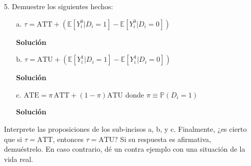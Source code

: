 \documentclass[a4paper, answers, addpoints, 11pt]{exam}
\begin{document}
\begin{itemize}
\begin{mdframed}
\begin{proof}
\begin{align*}
&=E[Y_i | D_i = 1] - E[Y_i | D_i = 0]\\&=E[Y_i^{1}  | D_i = 1] - E[Y_i^{0}  | D_i = 1] &\text{(Como $Y_i=Y_i^{0} (1-D_i)+ Y_i^{1} D_i$ )}
\\&=E[Y_i^{1}  | D_i = 1] - E[Y_i^{0}  | D_i = 1] &\text{(Como experimento es aleatorio $E[Y_i^{0} | D_i = 0]=E[Y_i^{0} | D_i = 0] $ )}\\&=\mathbb{E}[Y^{1}_{i} - Y^{0}_{i} | D_i = 1]
\end{align*}

     
\begin{align*}
E[Y_i | D_i = 1] - E[Y_i | D_i = 0] &= E[Y_i | D_i = 1] - E[Y_i | D_i = 1] \\&=\mathbb{E}[Y^{1}_{i} - Y^{0}_{i} | D_i = 1]\\&=\tau
\end{align*}
\end{proof}

        \end{mdframed}

    \item[5.] Demuestre los siguientes hechos:

    \begin{itemize}
        \item[a.] $\tau = \text{ATT}+\left( \mathbb{E}[Y^{0}_{i}|D_i=1]-\mathbb{E}[Y^{0}_{i}|D_i=0] \right)$
         \begin{mdframed}
        \textbf{Solución}\\
        \end{mdframed}

        \item[b.] $\tau= \text{ATU}+\left( \mathbb{E}[Y^{1}_{i}|D_i=1]-\mathbb{E}[Y^{1}_{i}|D_i=0] \right)$
         \begin{mdframed}
        \textbf{Solución}\\
        \end{mdframed}

        \item[c.] $\text{ATE}=\pi \,\text{ATT}+(1-\pi)\text{ATU}$ \quad donde $\pi \equiv \mathbb{P}(D_i=1)$
         \begin{mdframed}
        \textbf{Solución}
        \end{mdframed}
    \end{itemize}
    
    Interprete las proposiciones de los sub-incisos a, b, y c. Finalmente, ¿es cierto que si $\tau = \text{ATT}$, entonces $\tau = \text{ATU}$? Si su respuesta es afirmativa, demuéstrelo. En caso contrario, dé un contra ejemplo con una situación de la vida real. 
\end{itemize}
\end{document}
